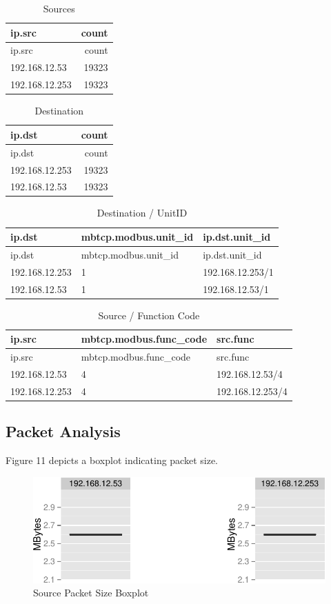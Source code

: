 \documentclass[11pt,a4paper]{article}
\begin{document}
\begin{longtable}[c]{@{}lr@{}}
\caption{Sources}\tabularnewline
\toprule
ip.src & count\tabularnewline
\midrule
\endfirsthead
\toprule
ip.src & count\tabularnewline
\midrule
\endhead
192.168.12.53 & 19323\tabularnewline
192.168.12.253 & 19323\tabularnewline
\bottomrule
\end{longtable}

\begin{longtable}[c]{@{}lr@{}}
\caption{Destination}\tabularnewline
\toprule
ip.dst & count\tabularnewline
\midrule
\endfirsthead
\toprule
ip.dst & count\tabularnewline
\midrule
\endhead
192.168.12.253 & 19323\tabularnewline
192.168.12.53 & 19323\tabularnewline
\bottomrule
\end{longtable}

\begin{longtable}[c]{@{}lll@{}}
\caption{Destination / UnitID}\tabularnewline
\toprule
ip.dst & mbtcp.modbus.unit\_id & ip.dst.unit\_id\tabularnewline
\midrule
\endfirsthead
\toprule
ip.dst & mbtcp.modbus.unit\_id & ip.dst.unit\_id\tabularnewline
\midrule
\endhead
192.168.12.253 & 1 & 192.168.12.253/1\tabularnewline
192.168.12.53 & 1 & 192.168.12.53/1\tabularnewline
\bottomrule
\end{longtable}


\begin{longtable}[c]{@{}lll@{}}
\caption{Source / Function Code}\tabularnewline
\toprule
ip.src & mbtcp.modbus.func\_code & src.func\tabularnewline
\midrule
\endfirsthead
\toprule
ip.src & mbtcp.modbus.func\_code & src.func\tabularnewline
\midrule
\endhead
192.168.12.53 & 4 & 192.168.12.53/4\tabularnewline
192.168.12.253 & 4 & 192.168.12.253/4\tabularnewline
\bottomrule
\end{longtable}

\subsection{Packet Analysis}\label{packet-analysis}

Figure 11 depicts a boxplot indicating packet size.

\begin{figure}[h]

{\centering \includegraphics{thesis_files/figure-latex/unnamed-chunk-21-1} 

}

\caption{Source Packet Size Boxplot}\label{fig:unnamed-chunk-21}
\end{figure}
\end{document}
